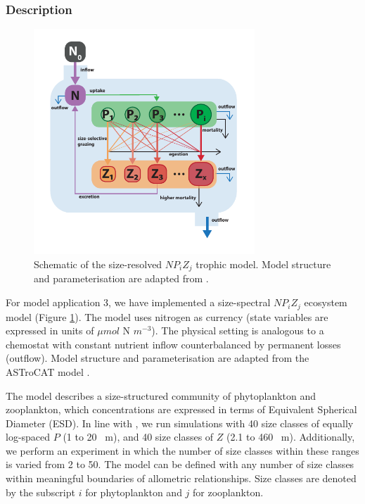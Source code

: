 \documentclass[journal abbreviation, manuscript]{copernicus}
\begin{document}
\subsubsection{Description}
\begin{figure}[t]
\includegraphics[width=8.3cm]{Figures/firstdraft_schematics/03_schematics_ASTroCAT.pdf}
\caption{Schematic of the size-resolved $NP_{i}Z_{j}$ trophic model. Model structure and parameterisation are adapted from \citet{Banas2011b}.}
\label{Figure:ModelSchematics_3}
\end{figure}

For model application 3, we have implemented a size-spectral $NP_{i}Z_{j}$ ecosystem model (Figure \ref{Figure:ModelSchematics_3}). The model uses nitrogen as currency (state variables are expressed in units of $\mu mol$ N $m^{-3}$). The physical setting is analogous to a chemostat with constant nutrient inflow counterbalanced by permanent losses (outflow). Model structure and parameterisation are adapted from the ASTroCAT model \citep{Banas2011b}.

The model describes a size-structured community of phytoplankton and zooplankton, which concentrations are expressed in terms of Equivalent Spherical Diameter (ESD). In line with \citet{Banas2011b}, we run simulations with 40 size classes of equally log-spaced $P$ (1 to 20 \unit{\mu m}), and 40 size classes of $Z$ (2.1 to 460  \unit{\mu m}). Additionally, we perform an experiment in which the number of size classes within these ranges is varied from 2 to 50. The model can be defined with any number of size classes within meaningful boundaries of allometric relationships. Size classes are denoted by the subscript $i$ for phytoplankton and $j$ for zooplankton.
\end{document}
